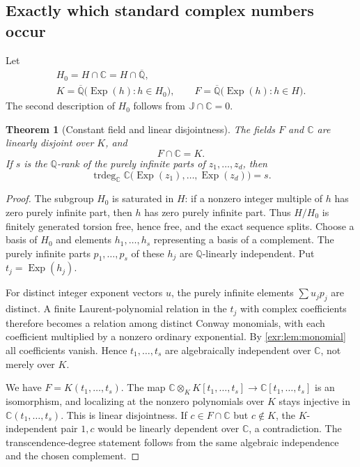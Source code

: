\documentclass[11pt,letterpaper]{article}
\numberwithin{equation}{section}
\newtheorem{theorem}{Theorem}[section]
\theoremstyle{definition}
\theoremstyle{remark}
\newcommand{\Q}{\mathbb Q}
\newcommand{\C}{\mathbb C}
\newcommand{\Qb}{\overline{\mathbb Q}}
\newcommand{\J}{\mathbb J}
\newcommand{\Exp}{\operatorname{Exp}}
\newcommand{\trdeg}{\operatorname{trdeg}}
\begin{document}
\subsection{Exactly which standard complex numbers occur}
Let
\begin{equation}
 \begin{gathered}
 H_0=H\cap\C=H\cap\Qb,\\
 K=\Qb\bigl(\Exp(h):h\in H_0\bigr),\qquad
 F=\Qb\bigl(\Exp(h):h\in H\bigr).
 \end{gathered}
\end{equation}
The second description of $H_0$ follows from $\J\cap\C=0$.

\begin{theorem}[Constant field and linear disjointness]\label{exr:thm:constants}
The fields $F$ and $\C$ are linearly disjoint over $K$, and
\begin{equation}\label{exr:eq:constantfield} F\cap\C=K. \end{equation}
If $s$ is the $\Q$-rank of the purely infinite parts of $z_1,\ldots,z_d$, then
\begin{equation}
 \trdeg_{\C}\C\bigl(\Exp(z_1),\ldots,\Exp(z_d)\bigr)=s.
\end{equation}
\end{theorem}
\begin{proof}
The subgroup $H_0$ is saturated in $H$: if a nonzero integer multiple of $h$ has
zero purely infinite part, then $h$ has zero purely infinite part. Thus $H/H_0$ is
finitely generated torsion free, hence free, and the exact sequence splits.
Choose a basis of $H_0$ and elements $h_1,\ldots,h_s$ representing a basis of a
complement. The purely infinite parts $p_1,\ldots,p_s$ of these $h_j$ are
$\Q$-linearly independent. Put $t_j=\Exp(h_j)$.

For distinct integer exponent vectors $u$, the purely infinite elements
$\sum u_jp_j$ are distinct. A finite Laurent-polynomial relation in the $t_j$ with
complex coefficients therefore becomes a relation among distinct Conway
monomials, with each coefficient multiplied by a nonzero ordinary exponential.
By \cref{exr:lem:monomial} all coefficients vanish. Hence $t_1,\ldots,t_s$ are
algebraically independent over $\C$, not merely over $K$.

We have $F=K(t_1,\ldots,t_s)$. The map
$\C\otimes_K K[t_1,\ldots,t_s]\to\C[t_1,\ldots,t_s]$ is an isomorphism, and
localizing at the nonzero polynomials over $K$ stays injective in
$\C(t_1,\ldots,t_s)$. This is linear disjointness. If $c\in F\cap\C$ but
$c\notin K$, the $K$-independent pair $1,c$ would be linearly dependent over $\C$,
a contradiction. The transcendence-degree statement follows from the same
algebraic independence and the chosen complement.
\end{proof}
\end{document}
